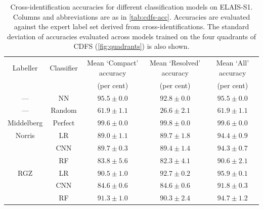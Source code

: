 \documentclass[fleqn,usenatbib,usedcolumn]{mnras}
\begin{document}
  \begin{table}
    \caption{Cross-identification accuracies for different classification models on ELAIS-S1. Columns and abbreviations are as in \autoref{tab:cdfs-acc}. Accuracies are evaluated against the expert label set derived from \citet{middelberg08} cross-identifications. The standard deviation of accuracies evaluated across models trained on the four quadrants of CDFS (\autoref{fig:quadrants}) is also shown.}
    \label{tab:elais-acc}
    \begin{tabular}{ccccc}
      \hline
      Labeller & Classifier & Mean `Compact' accuracy & Mean `Resolved' accuracy & Mean `All' accuracy\\
       &  & (per cent) & (per cent) & (per cent)\\
      \hline
      --- & NN & $95.5 \pm 0.0$ & $92.8 \pm 0.0$ & $95.5 \pm 0.0$\\
      --- & Random & $61.9 \pm 1.1$ & $26.6 \pm 2.1$ & $61.9 \pm 1.1$\\
      Middelberg & Perfect & $99.6 \pm 0.0$ & $99.8 \pm 0.0$ & $99.6 \pm 0.0$\\
      Norris & LR & $89.0 \pm 1.1$ & $89.7 \pm 1.8$ & $94.4 \pm 0.9$\\
             & CNN & $89.7 \pm 0.3$ & $89.4 \pm 1.4$ & $94.3 \pm 0.7$\\
             & RF & $83.8 \pm 5.6$ & $82.3 \pm 4.1$ & $90.6 \pm 2.1$\\
      RGZ & LR & $90.5 \pm 1.0$ & $92.7 \pm 0.2$ & $95.9 \pm 0.1$\\
          & CNN & $84.6 \pm 0.6$ & $84.6 \pm 0.6$ & $91.8 \pm 0.3$\\
          & RF & $91.3 \pm 1.0$ & $90.3 \pm 2.4$ & $94.7 \pm 1.2$\\
      \hline
    \end{tabular}
  \end{table}


\bsp	%
\label{lastpage}
\end{document}

